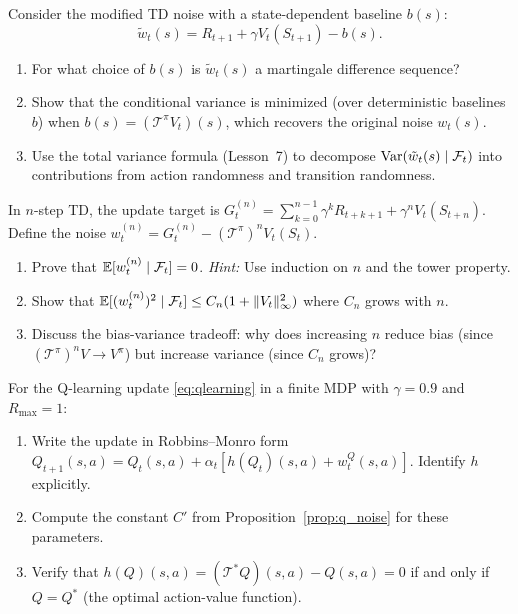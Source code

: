 \documentclass[11pt,a4paper]{article}
\begin{document}
\begin{exercise}
\label{ex:baselines}
Consider the modified TD noise with a state-dependent baseline
$b(s)$:
\[
  \tilde{w}_t(s)
  = R_{t+1} + \gamma V_t(S_{t+1}) - b(s).
\]
\begin{enumerate}[label=(\alph*)]
  \item For what choice of $b(s)$ is $\tilde{w}_t(s)$
    a martingale difference sequence?
  \item Show that the conditional variance is minimized
    (over deterministic baselines $b$) when
    $b(s) = (\mathcal{T}^\pi V_t)(s)$, which recovers the
    original noise $w_t(s)$.
  \item Use the total variance formula (Lesson~7) to
    decompose $\operatorname{Var}(\tilde{w}_t(s) \mid \mathcal{F}_t)$
    into contributions from action randomness and
    transition randomness.
\end{enumerate}
\end{exercise}

\begin{exercise}
\label{ex:nstep}
In $n$-step TD, the update target is
$G_t^{(n)} = \sum_{k=0}^{n-1} \gamma^k R_{t+k+1}
+ \gamma^n V_t(S_{t+n})$.  Define the noise
$w_t^{(n)} = G_t^{(n)} - (\mathcal{T}^\pi)^n V_t(S_t)$.
\begin{enumerate}[label=(\alph*)]
  \item Prove that $\mathbb{E}[w_t^{(n)} \mid \mathcal{F}_t] = 0$.
    \textit{Hint:} Use induction on $n$ and the tower
    property.
  \item Show that
    $\mathbb{E}[(w_t^{(n)})^2 \mid \mathcal{F}_t]
    \leq C_n(1 + \|V_t\|_\infty^2)$ where $C_n$ grows
    with $n$.
  \item Discuss the bias-variance tradeoff: why does
    increasing $n$ reduce bias (since
    $(\mathcal{T}^\pi)^n V \to V^\pi$) but increase
    variance (since $C_n$ grows)?
\end{enumerate}
\end{exercise}

\begin{exercise}
\label{ex:verify_rm}
For the Q-learning update \eqref{eq:qlearning} in a finite
MDP with $\gamma = 0.9$ and $R_{\max} = 1$:
\begin{enumerate}[label=(\alph*)]
  \item Write the update in Robbins--Monro form
    $Q_{t+1}(s,a) = Q_t(s,a)
    + \alpha_t[h(Q_t)(s,a) + w_t^Q(s,a)]$.
    Identify $h$ explicitly.
  \item Compute the constant $C'$ from
    Proposition~\ref{prop:q_noise} for these parameters.
  \item Verify that
    $h(Q)(s,a) = (\mathcal{T}^* Q)(s,a) - Q(s,a) = 0$
    if and only if $Q = Q^*$ (the optimal action-value
    function).
\end{enumerate}
\end{exercise}
\end{document}
